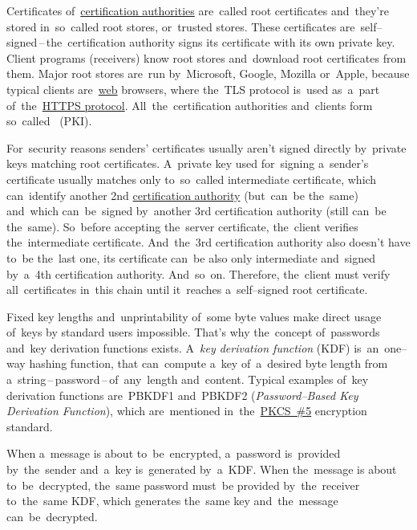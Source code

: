 Certificates of~\hyperref[certificationauthority]{certification authorities} are~called root certificates and~they're stored in~so~called root stores, or~trusted stores.
These certificates are~self--signed\,--\,the~certification authority signs its certificate with its own private key.
Client programs (receivers) know root stores and~download root certificates from them.
Major root stores are~run by~Microsoft, Google, Mozilla or~Apple, because typical clients are~\hyperref[internetweb]{web} browsers, where the~TLS protocol is~used as~a~part of~the~\hyperref[https]{HTTPS protocol}.
All~the~certification authorities and~clients form so~called ~(PKI).

For~security reasons senders' certificates usually aren't signed directly by~private keys matching root certificates.
A~private key used for~signing a~sender's certificate usually matches only to~so~called intermediate certificate, which can~identify another 2nd \hyperref[certificationauthority]{certification authority} (but~can~be the~same) and~which can~be~signed by~another 3rd certification authority (still can~be the~same).
So~before accepting the~server certificate, the~client verifies the~intermediate certificate.
And~the~3rd certification authority also doesn't have to~be the~last one, its certificate can~be also only intermediate and~signed by~a~4th certification authority.
And~so~on.
Therefore, the~client must verify all~certificates in~this chain until it~reaches a~self--signed root certificate.

\label{keypassword}
Fixed key lengths and~unprintability of~some byte values make direct usage of~keys by standard users impossible.
That's why the~concept of~passwords and~key derivation functions exists.
A~\textit{key derivation function} (KDF) is~an~one--way hashing function, that can~compute a~key of~a~desired byte length from a~string\,--\,password\,--\,of~any~length and~content.
Typical examples of~key derivation functions are~PBKDF1 and~PBKDF2 (\textit{Password--Based Key Derivation Function}), which are~mentioned in~the~\hyperref[pkcs]{PKCS~\#5} encryption standard.

When a~message is about to~be~encrypted, a~password is~provided by~the~sender and~a~key is~generated by~a~KDF\@.
When the~message is about to~be~decrypted, the~same password must~be provided by~the~receiver to~the~same KDF, which generates the~same key and~the~message can~be~decrypted.

